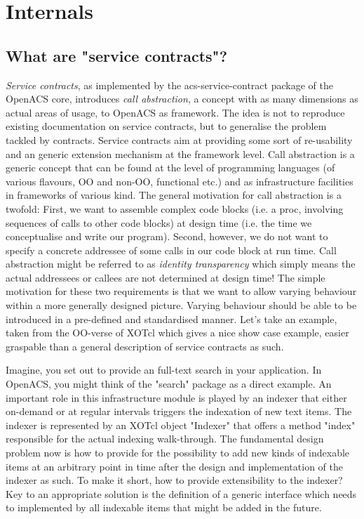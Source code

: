   \section{Internals}\label{sec:internal}
  \subsection{What are "service contracts"?}\label{sec:internal:contracts}
\emph{Service contracts}, as implemented by the acs-service-contract package of the OpenACS core, introduces \emph{call abstraction}, a concept with as many dimensions as actual areas of usage, to OpenACS as framework. The idea is not to reproduce existing documentation on service contracts, but to generalise the problem tackled by contracts. Service contracts aim at providing some sort of re-usability and an generic extension mechanism at the framework level. Call abstraction is a generic concept that can be found at the level of programming languages (of various flavours, OO and non-OO, functional etc.) and as infrastructure facilities in frameworks of various kind. The general motivation for call abstraction is a twofold: First, we want to assemble complex code blocks (i.e. a proc, involving sequences of calls to other code blocks) at design time (i.e. the time we conceptualise and write our program). Second, however, we do not want to specify a concrete addressee of some calls in our code block at run time. Call abstraction might be referred to as \emph{identity transparency} which simply means the actual addressees or callees are not determined at design time! The simple motivation for these two requirements is that we want to allow varying behaviour within a more generally designed picture. Varying behaviour should be able to be introduced in a pre-defined and standardised manner. Let's take an example, taken from the OO-verse of XOTcl which gives a nice show case example, easier graspable than a general description of service contracts as such. 
%

%
Imagine, you set out to provide an full-text search in your application. In OpenACS, you might think of the "search" package as a direct example. An important role in this infrastructure module is played by an indexer that either on-demand or at regular intervals triggers the indexation of new text items. The indexer is represented by an XOTcl object  "Indexer" that offers a method "index" responsible for the actual indexing walk-through. The fundamental design problem now is how to provide for the possibility to add new kinds of indexable items at an arbitrary point in time after the design and implementation of the indexer as such. To make it short, how to provide extensibility to the indexer? Key to an appropriate solution is the definition of a generic interface which needs to implemented by all indexable items that might be added in the future. 
